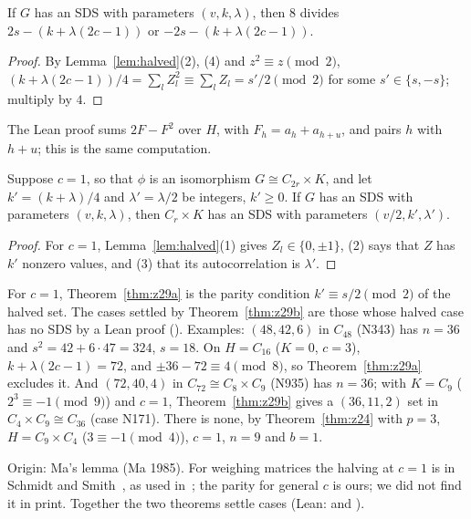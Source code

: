 \begin{theorem}\label{thm:z29a}
If $G$ has an SDS with parameters $(v,k,\lambda)$, then $8$ divides
$2s - (k + \lambda(2c-1))$ or $-2s - (k + \lambda(2c-1))$.
\end{theorem}

\begin{proof}
By Lemma~\ref{lem:halved}(2), (4) and $z^2 \equiv z \pmod 2$,
$(k + \lambda(2c-1))/4 = \sum_l Z_l^2 \equiv \sum_l Z_l = s'/2 \pmod 2$ for some
$s' \in \{s, -s\}$; multiply by $4$.
\end{proof}

The Lean proof sums $2F - F^2$ over $H$, with $F_h = a_h + a_{h+u}$, and pairs $h$ with $h + u$;
this is the same computation.

\begin{theorem}\label{thm:z29b}
Suppose $c = 1$, so that $\phi$ is an isomorphism $G \cong C_{2r} \times K$, and let
$k' = (k + \lambda)/4$ and $\lambda' = \lambda/2$ be integers, $k' \ge 0$. If $G$ has an SDS with parameters
$(v,k,\lambda)$, then $C_r \times K$ has an SDS with parameters $(v/2, k', \lambda')$.
\end{theorem}

\begin{proof}
For $c = 1$, Lemma~\ref{lem:halved}(1) gives $Z_l \in \{0, \pm 1\}$, (2) says that $Z$ has $k'$
nonzero values, and (3) that its autocorrelation is $\lambda'$.
\end{proof}

\begin{remark}\label{rem:z29}
For $c = 1$, Theorem~\ref{thm:z29a} is the parity condition $k' \equiv s/2 \pmod 2$ of the halved
set. The cases settled by Theorem~\ref{thm:z29b} are those whose halved case has no SDS by a Lean
proof (). Examples: $(48,42,6)$ in $C_{48}$ (N343)
has $n = 36$ and $s^2 = 42 + 6 \cdot 47 = 324$, $s = 18$. On $H = C_{16}$ ($K = 0$, $c = 3$),
$k + \lambda(2c-1) = 72$, and $\pm 36 - 72 \equiv 4 \pmod 8$, so Theorem~\ref{thm:z29a} excludes
it. And $(72,40,4)$ in $C_{72} \cong C_8 \times C_9$ (N935) has $n = 36$; with $K = C_9$ ($2^3
\equiv -1 \pmod 9$) and $c = 1$, Theorem~\ref{thm:z29b} gives a $(36,11,2)$ set in $C_4 \times
C_9 \cong C_{36}$ (case N171). There is none, by Theorem~\ref{thm:z24} with $p = 3$, $H = C_9
\times C_4$ ($3 \equiv -1 \pmod 4$), $c = 1$, $n = 9$ and $b = 1$.

Origin: Ma's lemma (Ma 1985). For weighing matrices the halving at $c = 1$ is in Schmidt and
Smith~\cite[Lemma~6.2]{schmidt-smith}, as used in~\cite[Thms.~4.22--4.23]{tan}; the parity for
general $c$ is ours; we did not find it in print. Together the two theorems settle 
cases (Lean:  and
).
\end{remark}

